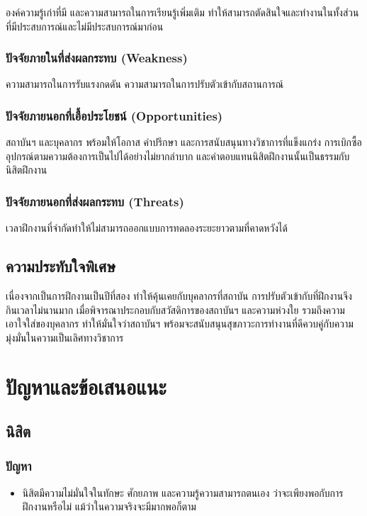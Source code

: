 \documentclass[16pt,a4]{internshipreport}
\begin{document}
องค์ความรู้เก่าที่มี และความสามารถในการเรียนรู้เพิ่มเติม ทำให้สามารถตัดสินใจและทำงานในทั้งส่วนที่มีประสบการณ์และไม่มีประสบการณ์มาก่อน

\subsection{ปัจจัยภายในที่ส่งผลกระทบ (Weakness)}

ความสามารถในการรับแรงกดดัน ความสามารถในการปรับตัวเข้ากับสถานการณ์

\subsection{ปัจจัยภายนอกที่เอื้อประโยชน์ (Opportunities)}

สถาบันฯ และบุคลากร พร้อมให้โอกาส คำปรึกษา และการสนับสนุนทางวิชาการที่แข็งแกร่ง การเบิกซื้ออุปกรณ์ตามความต้องการเป็นไปได้อย่างไม่ยากลำบาก และค่าตอบแทนนิสิตฝึกงานนั้นเป็นธรรมกับนิสิตฝึกงาน

\subsection{ปัจจัยภายนอกที่ส่งผลกระทบ (Threats)}

เวลาฝึกงานที่จำกัดทำให้ไม่สามารถออกแบบการทดลองระยะยาวตามที่คาดหวังได้
\section{ความประทับใจพิเศษ}

เนื่องจากเป็นการฝึกงานเป็นปีที่สอง ทำให้คุ้นเคยกับบุคลากรที่สถาบัน การปรับตัวเข้ากับที่ฝึกงานจึงกินเวลาไม่นานมาก เมื่อพิจารณาประกอบกับสวัสดิการของสถาบันฯ และความห่วงใย รวมถึงความเอาใจใส่ของบุคลากร ทำให้มั่นใจว่าสถาบันฯ พร้อมจะสนับสนุนสุขภาวะการทำงานที่ดีควบคู่กับความมุ่งมั่นในความเป็นเลิศทางวิชาการ

\chapter{ปัญหาและข้อเสนอแนะ}

\section{นิสิต}
\subsection{ปัญหา}

\begin{itemize}
    \item นิสิตมีความไม่มั่นใจในทักษะ ศักยภาพ และความรู้ความสามารถตนเอง ว่าจะเพียงพอกับการฝึกงานหรือไม่ แม้ว่าในความจริงจะมีมากพอก็ตาม
\end{itemize}
\end{document}
